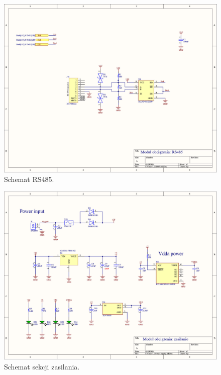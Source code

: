 \begin{figure}
    \begin{center}
        \includegraphics[width = 21cm]{zalaczniki/obciazenie/Obciążenie_aktywne_Strona_02.jpg}
        \caption{Schemat RS485.}
    \end{center}
\end{figure}

\begin{figure}
    \begin{center}
        \includegraphics[width = 21cm]{zalaczniki/obciazenie/Obciążenie_aktywne_Strona_03.jpg}
        \caption{Schemat sekcji zasilania.}
    \end{center}
\end{figure}

